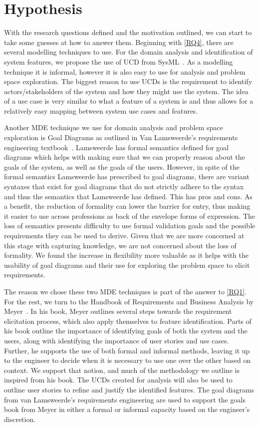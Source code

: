 \section{Hypothesis}

With the research questions defined and the motivation outlined, we can start to take some guesses at how to answer them. Beginning with \ref{RQ4}, there are several modelling techniques to use. For the domain analysis and identification of system features, we propose the use of \acf{UCD} from SysML~\cite{sysml2019omg}. As a modelling technique it is informal, however it is also easy to use for analysis and problem space exploration. The biggest reason to use \ac{UCD}s is the requirement to identify actors/stakeholders of the system and how they might use the system. The idea of a use case is very similar to what a feature of a system is and thus allows for a relatively easy mapping between system use cases and features.

Another \ac{MDE} technique we use for domain analysis and problem space exploration is Goal Diagrams as outlined in Van Lamsweerde's requirements engineering textbook~\cite{lamsweerde2009requirements}. Lamsweerde has formal semantics defined for goal diagrams which helps with making sure that we can properly reason about the goals of the system, as well as the goals of the users. However, in spite of the formal semantics Lamsweerde has prescribed to goal diagrams, there are variant syntaxes that exist for goal diagrams that do not strictly adhere to the syntax and thus the semantics that Lamsweerde has defined. This has pros and cons. As a benefit, the reduction of formality can lower the barrier for entry, thus making it easier to use across professions as back of the envelope forms of expression. The loss of semantics presents difficulty to use formal validation goals and the possible requirements they can be used to derive. Given that we are more concerned at this stage with capturing knowledge, we are not concerned about the loss of formality. We found the increase in flexibility more valuable as it helps with the usability of goal diagrams and their use for exploring the problem space to elicit requirements.

The reason we chose these two \ac{MDE} techniques is part of the answer to \ref{RQ1}. For the rest, we turn to the Handbook of Requirements and Business Analysis by Meyer~\cite{meyer2022handbook}. In his book, Meyer outlines several steps towards the requirement elicitation process, which also apply themselves to feature identification. Parts of his book outline the importance of identifying goals of both the system and the users, along with identifying the importance of user stories and use cases. Further, he supports the use of both formal and informal methods, leaving it up to the engineer to decide when it is necessary to use one over the other based on context. We support that notion, and much of the methodology we outline is inspired from his book. The \ac{UCD}s created for analysis will also be used to outline user stories to refine and justify the identified features. The goal diagrams from van Lamsweerde's requirements engineering are used to support the goals book from Meyer in either a formal or informal capacity based on the engineer's discretion.

